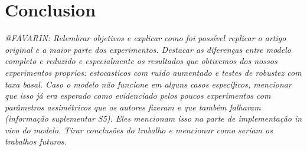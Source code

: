 \section{Conclusion}

  \textit{@FAVARIN: Relembrar objetivos e explicar como foi possível replicar o artigo original e a maior parte dos experimentos.
  Destacar as diferenças entre modelo completo e reduzido e especialmente os resultados que obtivemos dos nossos experimentos proprios: estocasticos com ruido aumentado e testes de robustez com taxa basal.
  Caso o modelo não funcione em alguns casos específicos, mencionar que isso já era esperado como evidenciado pelos poucos experimentos com parâmetros assimétricos que os autores fizeram e que também falharam (informação suplementar S5).
  Eles mencionam isso na parte de implementação in vivo do modelo.
  Tirar conclusões do trabalho e mencionar como seriam os trabalhos futuros.}


